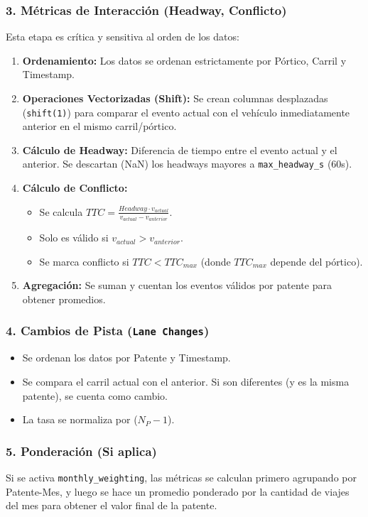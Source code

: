 \subsubsection{3. Métricas de Interacción (Headway, Conflicto)}
Esta etapa es crítica y sensitiva al orden de los datos:
\begin{enumerate}
    \item \textbf{Ordenamiento:} Los datos se ordenan estrictamente por Pórtico, Carril y Timestamp.
    \item \textbf{Operaciones Vectorizadas (Shift):} Se crean columnas desplazadas (\texttt{shift(1)}) para comparar el evento actual con el vehículo inmediatamente anterior en el mismo carril/pórtico.
    \item \textbf{Cálculo de Headway:} Diferencia de tiempo entre el evento actual y el anterior. Se descartan (NaN) los headways mayores a \texttt{max\_headway\_s} (60s).
    \item \textbf{Cálculo de Conflicto:}
        \begin{itemize}
            \item Se calcula $TTC = \frac{Headway \cdot v_{actual}}{v_{actual} - v_{anterior}}$.
            \item Solo es válido si $v_{actual} > v_{anterior}$.
            \item Se marca conflicto si $TTC < TTC_{max}$ (donde $TTC_{max}$ depende del pórtico).
        \end{itemize} 
    \item \textbf{Agregación:} Se suman y cuentan los eventos válidos por patente para obtener promedios.
\end{enumerate}

\subsubsection{4. Cambios de Pista (\texttt{Lane Changes})}
\begin{itemize}
    \item Se ordenan los datos por Patente y Timestamp.
    \item Se compara el carril actual con el anterior. Si son diferentes (y es la misma patente), se cuenta como cambio.
    \item La tasa se normaliza por ($N_P - 1$).
\end{itemize}

\subsubsection{5. Ponderación (Si aplica)}
Si se activa \texttt{monthly\_weighting}, las métricas se calculan primero agrupando por Patente-Mes, y luego se hace un promedio ponderado por la cantidad de viajes del mes para obtener el valor final de la patente.
